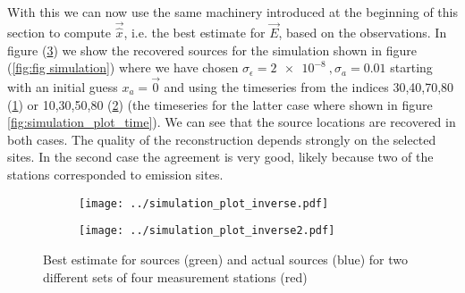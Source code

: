 \documentclass[]{article}
\begin{document}
With this we can now use the same machinery introduced at the beginning of this section to compute $\vec{\hat{x}}$, i.e. the best estimate for $\vec{E}$, based on the observations.
\newline \newline
In figure (\ref{fig:fig simulation inverse}) we show the recovered sources for the simulation shown in figure (\ref{fig:fig simulation}) where we have chosen $\sigma_\epsilon = \SI{2e-8}{}, \sigma_a = 0.01$ starting with an initial guess $x_a = \vec{0}$ and using the timeseries from the indices 30,40,70,80 (\ref{fig:simulation_plot inverse1}) or 10,30,50,80 (\ref{fig:simulation_plot inverse2}) (the timeseries for the latter case where shown in figure \ref{fig:simulation_plot_time}). We can see that the source locations are recovered in both cases. The quality of the reconstruction depends strongly on the selected sites. In the second case the agreement is very good, likely because two of the stations corresponded to emission sites.


\begin{figure}[h]
	\begin{center}
		\begin{subfigure}[b]{\textwidth}
			\centering
			\texttt{[image: ../simulation\_plot\_inverse.pdf]}
			\caption{}
			\label{fig:simulation_plot inverse1}
		\end{subfigure}%
		
		\begin{subfigure}[b]{\textwidth}
			\centering
			\texttt{[image: ../simulation\_plot\_inverse2.pdf]}
			\caption{}
			\label{fig:simulation_plot inverse2}
		\end{subfigure}
		\caption{Best estimate for sources (green) and actual sources (blue) for two different sets of four measurement stations (red)}
		\label{fig:fig simulation inverse}
	\end{center}
\end{figure}
\end{document}
